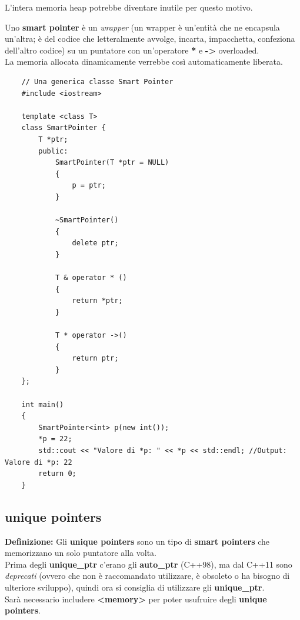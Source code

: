 \textsf{\small L'intera memoria heap potrebbe diventare inutile per questo motivo. } \break

\textsf{\small Uno \textbf{smart pointer} è un \emph{wrapper} (un wrapper è un'entità che ne encapsula un'altra; è del codice che letteralmente avvolge, incarta, impacchetta, confeziona dell'altro codice) su un puntatore con un'operatore \textbf{*} e \textbf{->} overloaded.} \\

\textsf{\small La memoria allocata dinamicamente verrebbe così automaticamente liberata.} \\

\begin{lstlisting}
	// Una generica classe Smart Pointer
	#include <iostream>
	
	template <class T>
	class SmartPointer {
		T *ptr;
		public:
			SmartPointer(T *ptr = NULL)
			{
				p = ptr;
			}
		
			~SmartPointer()
			{
				delete ptr;
			}
		
			T & operator * ()
			{
				return *ptr;
			}
		
			T * operator ->()
			{
				return ptr;
			}
	};

	int main()
	{
		SmartPointer<int> p(new int());
		*p = 22;
		std::cout << "Valore di *p: " << *p << std::endl; //Output: Valore di *p: 22
		return 0;
	}
\end{lstlisting}


\subsection{unique pointers}

\textsf{\small \textbf{Definizione: } Gli \textbf{unique pointers} sono un tipo di \textbf{smart pointers} che memorizzano un solo puntatore alla volta.} \\

\textsf{\small Prima degli \textbf{unique\_ptr} c'erano gli \textbf{auto\_ptr} (C++98), ma dal C++11 sono \emph{deprecati} (ovvero che non è raccomandato utilizzare, è obsoleto o ha bisogno di ulteriore sviluppo), quindi ora si consiglia di utilizzare gli \textbf{unique\_ptr}. } \\

\textsf{\small Sarà necessario includere \textbf{<memory>} per poter usufruire degli \textbf{unique pointers}.} \\

